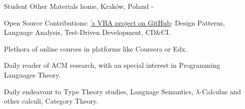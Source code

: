 \begin{cventries}
\cventry
	{Student}
	{Other Materials}
	{home, Kraków, Poland}
	{-}
	{
		\begin{cvitems} %
            \item {Open Source Contributions: \href{https://github.com/rubberduck-vba/Rubberduck}{'s VBA project on GitHub}: Design Patterns, Language Analysis, Test-Driven Development, CD\&CI.}
            \item {Plethora of online courses in platforms like Coursera or Edx.}
            \item {Daily reader of ACM research, with an special interest in Programming Languages Theory.}
			\item {Daily endeavour to Type Theory studies, Language Semantics, $\lambda$-Calculus and other calculi, Category Theory.}
        \end{cvitems}
	}

\end{cventries}
